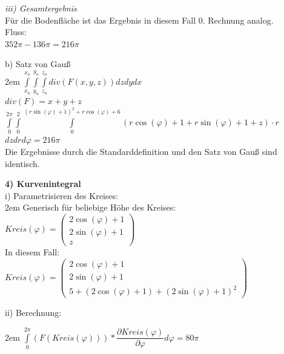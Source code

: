 \documentclass[11pt,final]{scrreprt}
\begin{document}
\emph{iii) Gesamtergebnis}\\
Für die Bodenfläche ist das Ergebnis in diesem Fall 0. Rechnung analog.\\
Fluss:\\
$ 352\pi - 136\pi = 216\pi$\\

\par	
\endgroup

b) Satz von Gauß\\

\begingroup
\leftskip2em 
$ \int\limits_{x_u}^{x_o}\int\limits_{y_u}^{y_o}\int\limits_{z_u}^{z_o} div(F(x, y, z)) dzdydx $\\

$ div(F) = x+y+z $\\

$ \int\limits_{0}^{2\pi}\int\limits_{0}^{2}\int\limits_{0}^{(r\sin(\varphi) + 1)^2 + r\cos(\varphi) + 6} (r\cos(\varphi)+1+r\sin(\varphi)+1+z)\cdot r$ $dzdrd\varphi = 216\pi$\\

Die Ergebnisse durch die Standarddefinition und den Satz von Gauß sind identisch.\\
\par	
\endgroup

\textbf{4) Kurvenintegral}\\

i) Parametrisieren des Kreises:\\

\begingroup
\leftskip2em 
Generisch für beliebige Höhe des Kreises:\\
$Kreis(\varphi) = \left(\begin{matrix}
2\cos(\varphi)+1\\ 2\sin(\varphi)+1\\ z
\end{matrix}\right)$\\

In diesem Fall:\\
$Kreis(\varphi) = \left(\begin{matrix}
2\cos(\varphi)+1\\ 2\sin(\varphi)+1\\ 5+(2\cos(\varphi)+1)+(2\sin(\varphi)+1)^2
\end{matrix}\right)$\\
\par	
\endgroup

ii) Berechnung:

\begingroup
\leftskip2em 
$ \int\limits_0^{2\pi} (F(Kreis(\varphi))) * \dfrac{\partial Kreis(\varphi)}{\partial\varphi} d\varphi = 80\pi$\\
\par	
\endgroup
\end{document}
